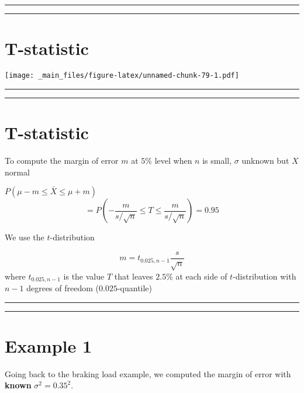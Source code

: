 \documentclass[
]{book}
\begin{document}
\begin{center}\rule{0.5\linewidth}{0.5pt}\end{center}

\begin{center}\rule{0.5\linewidth}{0.5pt}\end{center}

\hypertarget{t-statistic-1}{%
\section{T-statistic}\label{t-statistic-1}}

\texttt{[image: \_main\_files/figure-latex/unnamed-chunk-79-1.pdf]}

\begin{center}\rule{0.5\linewidth}{0.5pt}\end{center}

\begin{center}\rule{0.5\linewidth}{0.5pt}\end{center}

\hypertarget{t-statistic-2}{%
\section{T-statistic}\label{t-statistic-2}}

To compute the margin of error \(m\) at \(5\%\) level when \(n\) is small, \(\sigma\) unknown but \(X\) normal

\(P(\mu-m \leq \bar{X} \leq\mu + m)\)
\[=P(-\frac{m}{s/\sqrt{n}} \leq T \leq\frac{m}{s/\sqrt{n}})=0.95\]

We use the \(t\)-distribution

\[m=t_{0.025, n-1} \frac{s}{\sqrt{n}}\]
where \(t_{0.025, n-1}\) is the value \(T\) that leaves \(2.5\%\) at each side of \(t\)-distribution with \(n-1\) degrees of freedom (\(0.025\)-quantile)

\begin{center}\rule{0.5\linewidth}{0.5pt}\end{center}

\begin{center}\rule{0.5\linewidth}{0.5pt}\end{center}

\hypertarget{example-1-3}{%
\section{Example 1}\label{example-1-3}}

Going back to the braking load example, we computed the margin of error with \textbf{known} \(\sigma^2=0.35^2\).
\end{document}
